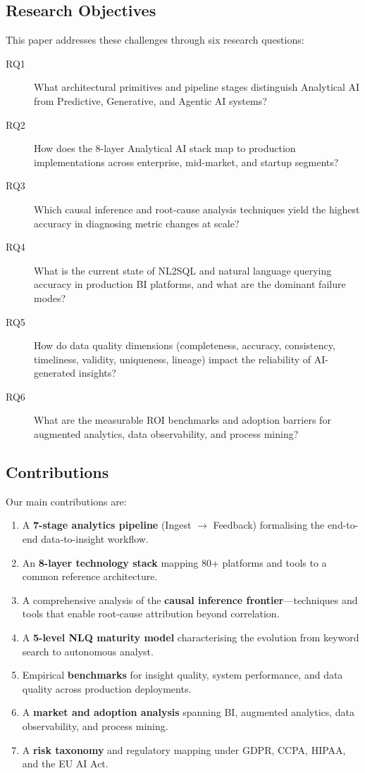 \documentclass[12pt, a4paper]{article}
\begin{document}
\subsection{Research Objectives}
This paper addresses these challenges through six research questions:

\begin{description}
    \item[RQ1] What architectural primitives and pipeline stages distinguish Analytical AI from Predictive, Generative, and Agentic AI systems?
    \item[RQ2] How does the 8-layer Analytical AI stack map to production implementations across enterprise, mid-market, and startup segments?
    \item[RQ3] Which causal inference and root-cause analysis techniques yield the highest accuracy in diagnosing metric changes at scale?
    \item[RQ4] What is the current state of NL2SQL and natural language querying accuracy in production BI platforms, and what are the dominant failure modes?
    \item[RQ5] How do data quality dimensions (completeness, accuracy, consistency, timeliness, validity, uniqueness, lineage) impact the reliability of AI-generated insights?
    \item[RQ6] What are the measurable ROI benchmarks and adoption barriers for augmented analytics, data observability, and process mining?
\end{description}

\subsection{Contributions}
Our main contributions are:
\begin{enumerate}
    \item A \textbf{7-stage analytics pipeline} (Ingest $\rightarrow$ Feedback) formalising the end-to-end data-to-insight workflow.
    \item An \textbf{8-layer technology stack} mapping 80+ platforms and tools to a common reference architecture.
    \item A comprehensive analysis of the \textbf{causal inference frontier}---techniques and tools that enable root-cause attribution beyond correlation.
    \item A \textbf{5-level NLQ maturity model} characterising the evolution from keyword search to autonomous analyst.
    \item Empirical \textbf{benchmarks} for insight quality, system performance, and data quality across production deployments.
    \item A \textbf{market and adoption analysis} spanning BI, augmented analytics, data observability, and process mining.
    \item A \textbf{risk taxonomy} and regulatory mapping under GDPR, CCPA, HIPAA, and the EU AI Act.
\end{enumerate}
\end{document}
